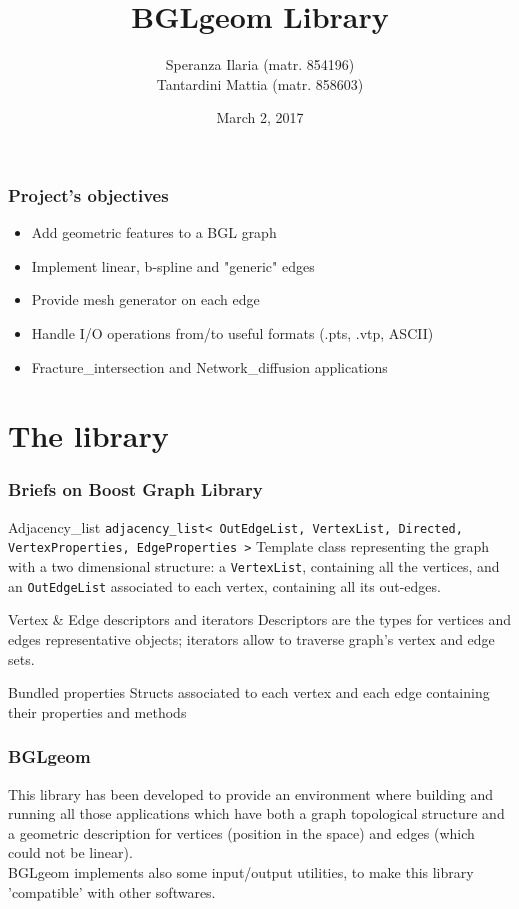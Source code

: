 \documentclass[11pt]{beamer}
\author{Speranza Ilaria (matr. 854196) \\ Tantardini Mattia (matr. 858603)}
\title{BGLgeom Library}
\institute{\textbf{Politecnico di Milano}}
\date{March 2, 2017}
\begin{document}
	\begin{frame}
		\maketitle
	\end{frame}
	
	\begin{frame}
		\frametitle{Project's objectives}
		\begin{itemize}
			\item Add geometric features to a BGL graph 
			\item Implement linear, b-spline and "generic" edges
			\item Provide mesh generator on each edge
			\item Handle I/O operations from/to useful formats (.pts, .vtp, ASCII) 
			\item Fracture\_intersection and Network\_diffusion applications 
		\end{itemize}
	\end{frame}
	
	\section{The library}
	\begin{frame}
		\frametitle{Briefs on Boost Graph Library}
		\begin{block}{Adjacency\_list}
			\texttt{adjacency\_list< OutEdgeList, VertexList, Directed, VertexProperties, EdgeProperties >} \newline
			Template class representing the graph with a two dimensional structure: 
			a \texttt{VertexList}, containing all the vertices, and an \texttt{OutEdgeList} associated to each vertex, containing all its out-edges.
		\end{block}
		
		\begin{block}{Vertex \& Edge descriptors and iterators}
			Descriptors are the types for vertices and edges representative objects; iterators allow to traverse graph's vertex and edge sets.
		\end{block}
		
		\begin{block}{Bundled properties}
			Structs associated to each vertex and each edge containing their properties and methods
		\end{block}	
	\end{frame}
	
	\begin{frame}
		\frametitle{BGLgeom}
		This library has been developed to provide an environment where building and running all those applications which have both a graph topological structure and a geometric description for vertices (position in the space) and edges (which could not be linear).\\
		BGLgeom implements also some input/output utilities, to make this library 'compatible' with other softwares.
	\end{frame}
	
\end{document}
